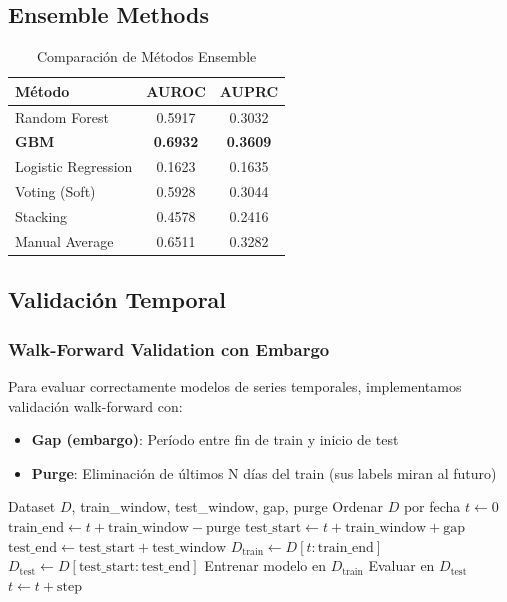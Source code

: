 \documentclass[11pt,a4paper]{article}
\begin{document}
\subsection{Ensemble Methods}

\begin{table}[H]
\centering
\caption{Comparación de Métodos Ensemble}
\begin{tabular}{lcc}
\toprule
\textbf{Método} & \textbf{AUROC} & \textbf{AUPRC} \\
\midrule
Random Forest & 0.5917 & 0.3032 \\
\textbf{GBM} & \textbf{0.6932} & \textbf{0.3609} \\
Logistic Regression & 0.1623 & 0.1635 \\
Voting (Soft) & 0.5928 & 0.3044 \\
Stacking & 0.4578 & 0.2416 \\
Manual Average & 0.6511 & 0.3282 \\
\bottomrule
\end{tabular}
\end{table}

\subsection{Validación Temporal}

\subsubsection{Walk-Forward Validation con Embargo}

Para evaluar correctamente modelos de series temporales, implementamos validación walk-forward con:

\begin{itemize}
    \item \textbf{Gap (embargo)}: Período entre fin de train y inicio de test
    \item \textbf{Purge}: Eliminación de últimos N días del train (sus labels miran al futuro)
\end{itemize}

\begin{algorithm}[H]
\caption{Walk-Forward Validation con Embargo}
\begin{algorithmic}[1]
\Require Dataset $D$, train\_window, test\_window, gap, purge
\State Ordenar $D$ por fecha
\State $t \gets 0$
    \State $\text{train\_end} \gets t + \text{train\_window} - \text{purge}$
    \State $\text{test\_start} \gets t + \text{train\_window} + \text{gap}$
    \State $\text{test\_end} \gets \text{test\_start} + \text{test\_window}$
    \State $D_{\text{train}} \gets D[t : \text{train\_end}]$
    \State $D_{\text{test}} \gets D[\text{test\_start} : \text{test\_end}]$
    \State Entrenar modelo en $D_{\text{train}}$
    \State Evaluar en $D_{\text{test}}$
    \State $t \gets t + \text{step}$
\EndWhile
\end{algorithmic}
\end{algorithm}
\end{document}
